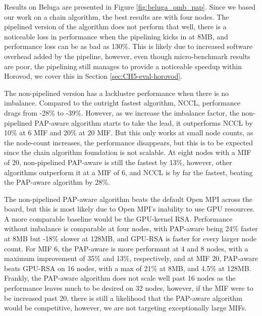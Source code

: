 

Results on Beluga are presented in Figure \ref{fig:beluga_omb_pap}.
Since we based our work on a chain algorithm, the best results are with four nodes.
The pipelined version of the algorithm does not perform that well, there is a noticeable loss in performance when the pipelining kicks in at 8MB, and performance loss can be as bad as 130\%.
This is likely due to increased software overhead added by the pipeline, however, even though micro-benchmark results are poor, the pipelining still manages to provide a noticeable speedup within Horovod, we cover this in Section \ref{sec:CH5-eval-horovod}.

The non-pipelined version has a lacklustre performance when there is no imbalance.
Compared to the outright fastest algorithm, \gls{NCCL}, performance drags from -28\% to -39\%.
However, as we increase the imbalance factor, the non-pipelined \gls{PAP}-aware algorithm starts to take the lead, it outperforms \gls{NCCL} by 10\% at 6 \gls{MIF} and 20\% at 20 \gls{MIF}.
But this only works at small node counts, as the node-count increases, the performance disappears, but this is to be expected since the chain algorithm foundation is not scalable.
At eight nodes with a \gls{MIF} of 20, non-pipelined \gls{PAP}-aware is still the fastest by 13\%, however, other algorithms outperform it at a \gls{MIF} of 6, and \gls{NCCL} is by far the fastest, beating the \gls{PAP}-aware algorithm by 28\%.




The non-pipelined \gls{PAP}-aware algorithm beats the default Open MPI across the board, but this is most likely due to Open MPI's inability to use \gls{GPU} resources.
A more comparable baseline would be the \gls{GPU}-kernel \gls{RSA}.
Performance without imbalance is comparable at four nodes, with \gls{PAP}-aware being 24\% faster at 8MB but -18\% slower at 128MB, and \gls{GPU}-\gls{RSA} is faster for every larger node count.
For \gls{MIF} 6, the \gls{PAP}-aware is more performant at 4 and 8 nodes, with a maximum improvement of 35\% and 13\%, respectively, and at \gls{MIF} 20, \gls{PAP}-aware beats \gls{GPU}-\gls{RSA} on 16 nodes, with a max of 21\% at 8MB, and 4.5\% at 128MB.
Frankly, the \gls{PAP}-aware algorithm does not scale well past 16 nodes as the performance leaves much to be desired  on 32 nodes, however, if the \gls{MIF} were to be increased past 20, there is still a likelihood that the \gls{PAP}-aware algorithm would be competitive, however, we are not targeting exceptionally large \gls{MIF}s. 

